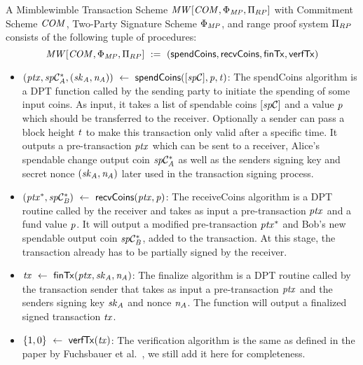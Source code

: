 \begin{definition}
    \label{def:atom:mw-tx-scheme}
    A Mimblewimble Transaction Scheme $\mathit{MW}[\mathit{COM},\Phi_{\mathit{MP}},\Pi_{RP}]$ with Commitment Scheme $\mathit{COM}$, Two-Party Signature Scheme $\Phi_{\mathit{MP}}$, and range proof system $\Pi_{RP}$ consists of the following tuple of procedures:
    \[ \mathit{MW}[\mathit{COM},\Phi_{\mathit{MP}},\Pi_{RP}] ~:=~ ( \mathsf{spendCoins},\mathsf{recvCoins},\mathsf{finTx},\mathsf{verfTx} ) \]
    \begin{itemize}
        \item $(\mathit{ptx}, \mathit{sp}\mathcal{C}_{\mathit{A}}^*, (\mathit{sk}_{\mathit{A}}, \mathit{\mathit{n}_{\mathit{A}}})) ~\leftarrow~ \mathsf{spendCoins}([\mathit{sp}\mathcal{C}],\mathit{p},\mathit{t})$: The spendCoins algorithm is a DPT function called by the sending party to initiate the spending of some input coins.
        As input, it takes a list of spendable coins $[\mathit{sp}\mathcal{C}]$ and a value $\mathit{p}$ which should be transferred to the receiver.
        Optionally a sender can pass a block height $\mathit{t}$ to make this transaction only valid after a specific time.
        It outputs a pre-transaction $\mathit{ptx}$ which can be sent to a receiver, Alice's spendable change output coin $\mathit{sp}\mathcal{C}_{\mathit{A}}^*$ as well as the senders signing key and secret nonce $(\mathit{sk}_{\mathit{A}}, \mathit{\mathit{n}_{\mathit{A}}})$ later used in the transaction signing process.
        \item $(\mathit{ptx}^*, \mathit{sp}\mathcal{C}_{\mathit{B}}^*) ~\leftarrow~ \mathsf{recvCoins}(\mathit{ptx},\mathit{p})$: The receiveCoins algorithm is a DPT routine called by the receiver and takes as input a pre-transaction $\mathit{ptx}$ and a fund value
        $\mathit{p}$.
        It will output a modified pre-transaction $\mathit{ptx}^*$ and Bob's new spendable output coin $\mathit{sp}\mathcal{C}_{\mathit{B}}^*$, added to the transaction.
        At this stage, the transaction already has to be partially signed by the receiver.
        \item $\mathit{tx} ~\leftarrow~ \mathsf{finTx}(\mathit{ptx},\mathit{sk}_{\mathit{A}},\mathit{\mathit{n}_{\mathit{A}}})$: The finalize algorithm is a DPT routine called by the transaction sender that takes as input a pre-transaction $\mathit{ptx}$ and the senders signing key $\mathit{sk}_{\mathit{A}}$ and nonce $\mathit{\mathit{n}_{\mathit{A}}}$.
        The function will output a finalized signed transaction $\mathit{tx}$.
        \item $\{1,0\} ~\leftarrow~ \mathsf{verfTx}(\mathit{tx})$: The verification algorithm is the same as defined in the paper by Fuchsbauer et al.~\cite{fuchsbauer2019aggregate}, we still add it here for completeness.

\end{itemize}
\end{definition}
